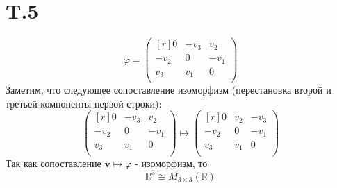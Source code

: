 \documentclass[a4paper,12pt]{article} %
\begin{document}
\section*{T.5}
$$\varphi=\begin{pmatrix*}[r]
    0&-v_{3}&v_{2}\\
    -v_{2}&0&-v_{1}\\
    v_{3}&v_{1}&0\\
\end{pmatrix*}$$
Заметим, что следующее сопоставление изоморфизм (перестановка второй и третьей компоненты первой строки):
$$\begin{pmatrix*}[r]
    0&-v_{3}&v_{2}\\
    -v_{2}&0&-v_{1}\\
    v_{3}&v_{1}&0\\
\end{pmatrix*}\mapsto\begin{pmatrix*}[r]
    0&v_{2}&-v_{3}\\
    -v_{2}&0&-v_{1}\\
    v_{3}&v_{1}&0\\
\end{pmatrix*}$$
Так как сопоставление $\textbf{v}\mapsto\varphi$ - изоморфизм, то
$$\mathbb{R}^{3}\cong M_{3\times3}(\mathbb{R})$$
\end{document}
